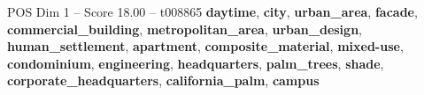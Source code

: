 \begin{textsample}{POS Dim 1 – Score 18.00 – t008865}  \label{ex:f1_pos_028}
\textbf{daytime}, \textbf{city}, \textbf{urban\_area}, \textbf{facade}, \textbf{commercial\_building}, \textbf{metropolitan\_area}, \textbf{urban\_design}, \textbf{human\_settlement}, \textbf{apartment}, \textbf{composite\_material}, \textbf{mixed-use}, \textbf{condominium}, \textbf{engineering}, \textbf{headquarters}, \textbf{palm\_trees}, \textbf{shade}, \textbf{corporate\_headquarters}, \textbf{california\_palm}, \textbf{campus}

\end{textsample}
